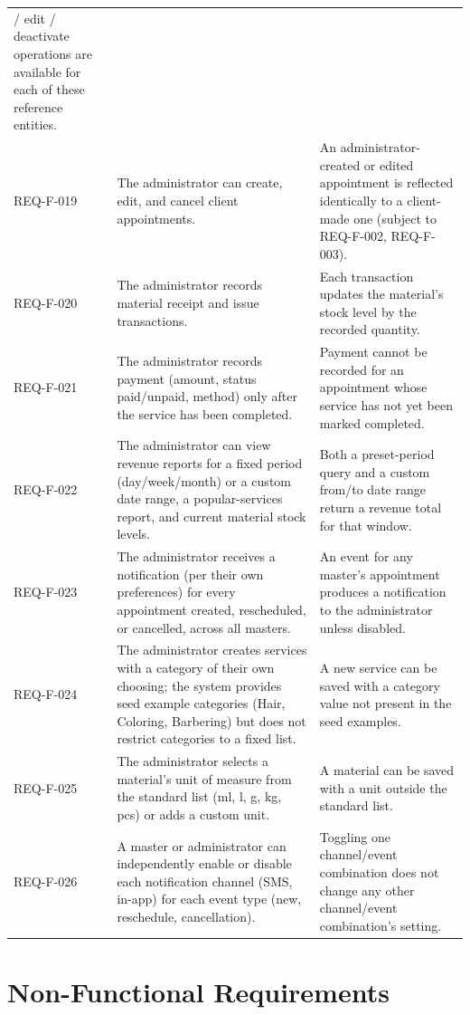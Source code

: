 \documentclass[11pt,a4paper]{article}
\begin{document}
\begin{longtable}{L{1.9cm}L{6.4cm}L{6.2cm}}
  / edit / deactivate operations are available for each of these reference
  entities. \\
REQ-F-019 & The administrator can create, edit, and cancel client
  appointments. & An administrator-created or edited appointment is
  reflected identically to a client-made one (subject to REQ-F-002,
  REQ-F-003). \\
REQ-F-020 & The administrator records material receipt and issue
  transactions. & Each transaction updates the material's stock level by
  the recorded quantity. \\
REQ-F-021 & The administrator records payment (amount, status paid/unpaid,
  method) only after the service has been completed. & Payment cannot be
  recorded for an appointment whose service has not yet been marked
  completed. \\
REQ-F-022 & The administrator can view revenue reports for a fixed period
  (day/week/month) or a custom date range, a popular-services report, and
  current material stock levels. & Both a preset-period query and a custom
  from/to date range return a revenue total for that window. \\
REQ-F-023 & The administrator receives a notification (per their own
  preferences) for every appointment created, rescheduled, or cancelled,
  across all masters. & An event for any master's appointment produces a
  notification to the administrator unless disabled. \\
REQ-F-024 & The administrator creates services with a category of their own
  choosing; the system provides seed example categories (Hair, Coloring,
  Barbering) but does not restrict categories to a fixed list. & A new
  service can be saved with a category value not present in the seed
  examples. \\
REQ-F-025 & The administrator selects a material's unit of measure from the
  standard list (ml, l, g, kg, pcs) or adds a custom unit. & A material can
  be saved with a unit outside the standard list. \\
REQ-F-026 & A master or administrator can independently enable or disable
  each notification channel (SMS, in-app) for each event type (new,
  reschedule, cancellation). & Toggling one channel/event combination does
  not change any other channel/event combination's setting. \\
\bottomrule
\end{longtable}

\section{Non-Functional Requirements}
\label{sec:nonfunctional}
\end{document}
